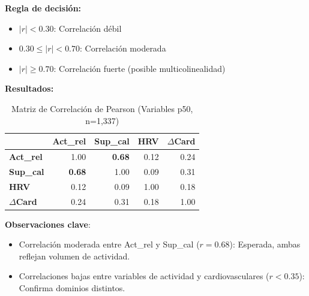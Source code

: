 \documentclass[12pt,letterpaper,twoside]{report}
\begin{document}
\begin{reglabox}
\textbf{Regla de decisión:}

\begin{itemize}[noitemsep]
    \item $|r| < 0.30$: Correlación débil
    \item $0.30 \leq |r| < 0.70$: Correlación moderada
    \item $|r| \geq 0.70$: Correlación fuerte (posible multicolinealidad)
\end{itemize}
\end{reglabox}

\begin{calculobox}
\textbf{Resultados:}

\begin{table}[H]
\centering
\caption{Matriz de Correlación de Pearson (Variables p50, n=1,337)}
\label{tab:correlation_matrix}
\begin{tabular}{@{}lrrrr@{}}
\toprule
 & \textbf{Act\_rel} & \textbf{Sup\_cal} & \textbf{HRV} & \textbf{$\Delta$Card} \\
\midrule
\textbf{Act\_rel}     & 1.00 & \textbf{0.68} & 0.12 & 0.24 \\
\textbf{Sup\_cal}     & \textbf{0.68} & 1.00 & 0.09 & 0.31 \\
\textbf{HRV}          & 0.12 & 0.09 & 1.00 & 0.18 \\
\textbf{$\Delta$Card} & 0.24 & 0.31 & 0.18 & 1.00 \\
\bottomrule
\end{tabular}
\end{table}

\textbf{Observaciones clave}:
\begin{itemize}[noitemsep]
    \item Correlación moderada entre Act\_rel y Sup\_cal ($r=0.68$): Esperada, ambas reflejan volumen de actividad.
    \item Correlaciones bajas entre variables de actividad y cardiovasculares ($r < 0.35$): Confirma dominios distintos.
\end{itemize}
\end{calculobox}
\end{document}
